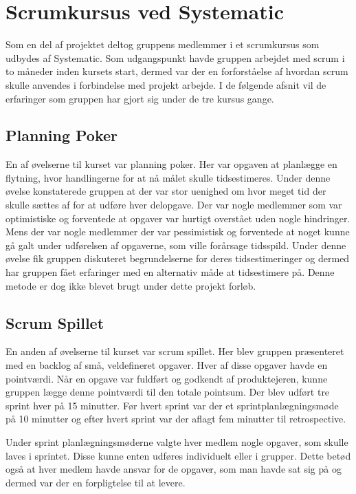 \chapter{Scrumkursus ved Systematic}
Som en del af projektet deltog gruppens medlemmer i et scrumkursus som udbydes af Systematic. Som udgangspunkt havde gruppen arbejdet med scrum i to måneder inden kursets start, dermed var der en forforståelse af hvordan scrum skulle anvendes i forbindelse med projekt arbejde. I de følgende afsnit vil de erfaringer som gruppen har gjort sig under de tre kursus gange. 

\section{Planning Poker}
En af øvelserne til kurset var planning poker. Her var opgaven at planlægge en flytning, hvor handlingerne for at nå målet skulle tidsestimeres. Under denne øvelse konstaterede gruppen at der var stor uenighed om hvor meget tid der skulle sættes af for at udføre hver delopgave. Der var nogle medlemmer som var optimistiske og forventede at opgaver var hurtigt overstået uden nogle hindringer. Mens der var nogle medlemmer der var pessimistisk og forventede at noget kunne gå galt under udførelsen af opgaverne, som ville forårsage tidsspild. Under denne øvelse fik gruppen diskuteret begrundelserne for deres tidsestimeringer og dermed har gruppen fået erfaringer med en alternativ måde at tidsestimere på. Denne metode er dog ikke blevet brugt under dette projekt forløb.  

\section{Scrum Spillet}
En anden af øvelserne til kurset var scrum spillet. Her blev gruppen præsenteret med en backlog af små, veldefineret opgaver. Hver af disse opgaver havde en pointværdi. Når en opgave var fuldført og godkendt af produktejeren, kunne gruppen lægge denne pointværdi til den totale pointsum. Der blev udført tre sprint hver på 15 minutter. Før hvert sprint var der et sprintplanlægningsmøde på 10 minutter og efter hvert sprint var der aflagt fem minutter til retrospective. \newline

Under sprint planlægningsmøderne valgte hver medlem nogle opgaver, som skulle laves i sprintet. Disse kunne enten udføres individuelt eller i grupper. Dette betød også at hver medlem havde ansvar for de opgaver, som man havde sat sig på og dermed var der en forpligtelse til at levere. \newline

